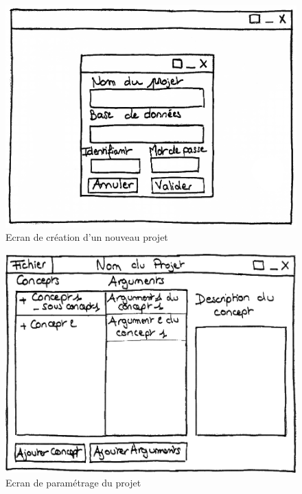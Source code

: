 \documentclass[12pt]{report}
\begin{document}
\begin{figure}
\centering
\includegraphics[scale=0.5]{IHM_3a.png}
\caption{Ecran de création d'un nouveau projet}
\end{figure}
\begin{figure}
\centering
\includegraphics[scale=0.5]{IHM_3b.png}
\caption{Ecran de paramétrage du projet}
\end{figure}
\end{document}
